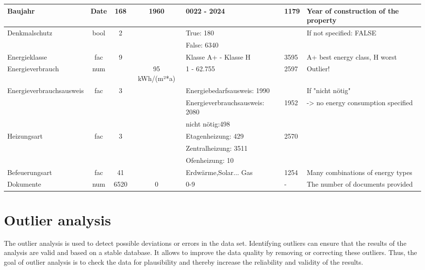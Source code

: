 \begin{landscape}
\begin{tabular}{|l||c|c|c|l|l|l|}
		Baujahr         & Date & 168                 & 1960   			& 0022 - 2024                    & 1179 &  Year of construction of the property\\ \hline
		Denkmalschutz   & bool & 2                   &	    			& True: 180                      & & If not specified: FALSE \\ 
		&      &                     &    				& False: 6340                    & & \\ \hline
		Energieklasse   & fac  & 9                   &    				& Klasse A+ - Klasse H           & 3595 & A+ best energy class, H worst   \\ \hline
		Energieverbrauch& num  &                     &	95  kWh/(m²*a)& 1 - 62.755                    & 2597  & Outlier! \\ \hline
		Energieverbrauchsausweis & fac  & 3                   &	                 & Energiebedarfsausweis: 1990   &  &If "nicht nötig"    \\ 
		&      &                     &	                 & Energieverbrauchsausweis: 2080  &  1952 &  -> no energy consumption specified \\ 
		&      &                     &	                 & nicht nötig:498               &     &\\ \hline
		Heizungsart & fac  & 3                   &	                 & Etagenheizung: 429            & 2570 &     \\ 
		&      &                     &	                 & Zentralheizung: 3511          &    &  \\ 
		&      &                     &	                 & Ofenheizung: 10          &     & \\ \hline
		Befeuerungsart  & fac  & 41                  &	                 & Erdwärme,Solar... Gas         & 1254 & Many combinations of energy types \\ \hline
		Dokumente       & num  & 6520                &	  0             & 0-9           		         & - & The number of documents provided \\ \hline
	\end{tabular}
	\label{tbl: vor der Analyse}
\end{landscape}
\section{Outlier analysis}\label{sec:Ausreißeranalyse}

The outlier analysis is used to detect possible deviations or errors in the data set. Identifying outliers can ensure that the results of the analysis are valid and based on a stable database. It allows to improve the data quality by removing or correcting these outliers. Thus, the goal of outlier analysis is to check the data for plausibility and thereby increase the reliability and validity of the results. 

